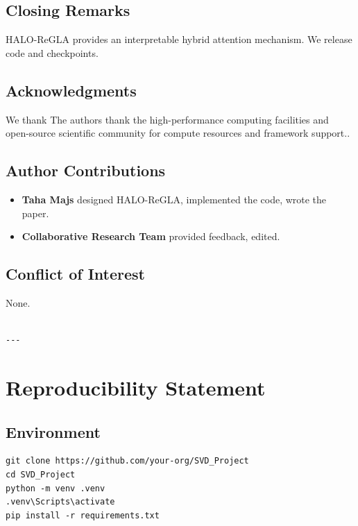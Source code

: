 \subsection{Closing Remarks}

HALO-ReGLA provides an interpretable hybrid attention mechanism. We release 
code and checkpoints.

\subsection{Acknowledgments}

We thank The authors thank the high-performance computing facilities and open-source scientific community for compute resources and framework support..

\subsection{Author Contributions}

\begin{itemize}
\item \textbf{Taha Majs} designed HALO-ReGLA, implemented the code, wrote the paper.
\item \textbf{Collaborative Research Team} provided feedback, edited.

\end{itemize}
\subsection{Conflict of Interest}

None.
\begin{lstlisting}

---
\end{lstlisting}


\section{Reproducibility Statement}

\subsection{Environment}

\begin{lstlisting}
git clone https://github.com/your-org/SVD_Project
cd SVD_Project
python -m venv .venv
.venv\Scripts\activate
pip install -r requirements.txt
\end{lstlisting}

